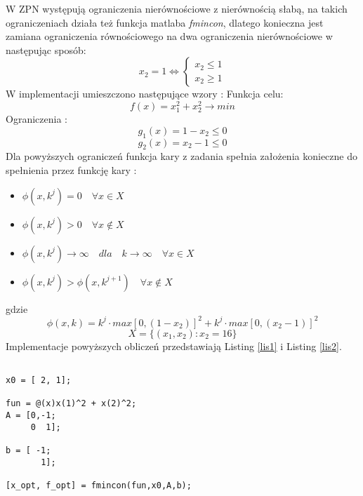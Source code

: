 \documentclass[a4paper,15pt]{article}
\begin{document}
W ZPN występują ograniczenia nierównościowe z nierównością słabą, na takich ograniczeniach działa też funkcja matlaba \textit{fmincon}, dlatego konieczna jest zamiana ograniczenia równościowego na dwa ograniczenia nierównościowe w następując sposób: 
\begin{equation*}
x_{2} = 1 \iff 
\begin{cases}
x_{2} \leq 1 \\
x_{2} \geq 1
\end{cases} 
\end{equation*}
W implementacji umieszczono następujące wzory :
Funkcja celu: 
\begin{equation*}
f(x) = x_{1}^{2}+x_{2}^{2} \rightarrow min
\end{equation*}
Ograniczenia :
\begin{equation*}
g_{1}(x) = 1 - x_{2} \leq 0
\end{equation*}
\begin{equation*}
g_{2}(x) = x_{2} - 1 \leq 0
\end{equation*}
Dla powyższych ograniczeń funkcja kary z zadania spełnia założenia konieczne do spełnienia przez funkcję kary : 
\begin{itemize}
\item \( \phi(x,k^{j}) = 0 \quad \forall x \in X \)
\item \( \phi(x,k^{j}) > 0 \quad \forall x \not\in X \)
\item \( \phi(x,k^{j}) \rightarrow \infty \quad dla \quad k \rightarrow \infty \quad \forall x \in X \)
\item \( \phi(x,k^{j}) > \phi(x,k^{j+1}) \quad \forall x \not\in X \) 
\end{itemize}
gdzie
\begin{equation*}
\phi(x,k) = k^{j} \cdot max[0, (1-x_{2})]^{2} + k^{j} \cdot max[0, (x_{2} - 1)]^{2}
\end{equation*}
\begin{equation*}
X = \{ (x_{1},x_{2}) : x_{2} = 16 \}
\end{equation*}
Implementacje powyższych obliczeń przedstawiają Listing \ref{lis1} i Listing \ref{lis2}.
\begin{lstlisting}[caption=Znalezienie minimum z ograniczeniami ( fmincon ), captionpos=b,label=lis1, firstnumber=12,frame=single]
% znalezienie minimum z ograniczeniami

x0 = [ 2, 1]; 

fun = @(x)x(1)^2 + x(2)^2;
A = [0,-1;
     0  1];
 
b = [ -1;
       1];

[x_opt, f_opt] = fmincon(fun,x0,A,b);
\end{lstlisting}
\end{document}
